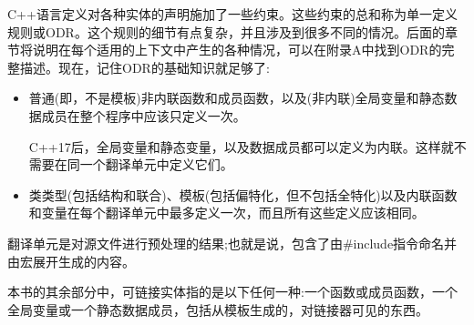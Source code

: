 C++语言定义对各种实体的声明施加了一些约束。这些约束的总和称为单一定义规则或ODR。这个规则的细节有点复杂，并且涉及到很多不同的情况。后面的章节将说明在每个适用的上下文中产生的各种情况，可以在附录A中找到ODR的完整描述。现在，记住ODR的基础知识就足够了:

\begin{itemize}
\item 
普通(即，不是模板)非内联函数和成员函数，以及(非内联)全局变量和静态数据成员在整个程序中应该只定义一次。

\begin{notice}C++17后，全局变量和静态变量，以及数据成员都可以定义为内联。这样就不需要在同一个翻译单元中定义它们。
\end{notice}

\item 
类类型(包括结构和联合)、模板(包括偏特化，但不包括全特化)以及内联函数和变量在每个翻译单元中最多定义一次，而且所有这些定义应该相同。
\end{itemize}

翻译单元是对源文件进行预处理的结果;也就是说，包含了由\#include指令命名并由宏展开生成的内容。

本书的其余部分中，可链接实体指的是以下任何一种:一个函数或成员函数，一个全局变量或一个静态数据成员，包括从模板生成的，对链接器可见的东西。




































